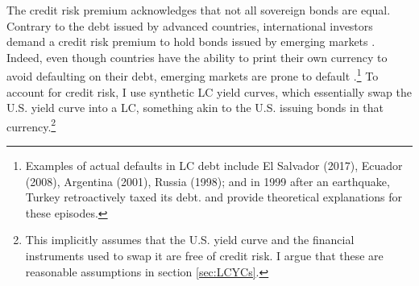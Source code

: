 {%
The credit risk premium acknowledges that not all sovereign bonds are equal.
Contrary to the debt issued by advanced countries,
international investors demand a credit risk premium to hold bonds issued by emerging markets \citep{DuSchreger:2016JoF}.
Indeed, even though countries have the ability to
print their own currency to avoid defaulting on their debt, emerging markets are prone to default  \citep{ReinhartRogoff:2011,ErceMallucci:2018}.\footnote{ Examples of actual defaults in LC debt include El Salvador (2017), Ecuador (2008), Argentina (2001), Russia (1998); and in 1999 after an earthquake, Turkey retroactively taxed its debt. \cite{DuSchreger:2016WP} and \cite{Galli:2020} provide theoretical explanations for these episodes.} 
To account for credit risk, 
I use synthetic LC yield curves, which essentially swap the U.S. yield curve into a LC,
something akin to the U.S. issuing bonds in that currency.\footnote{ This implicitly assumes that the U.S. yield curve and the financial instruments used to swap it are free of credit risk. I argue that these are reasonable assumptions in section \ref{sec:LCYCs}.}
}
